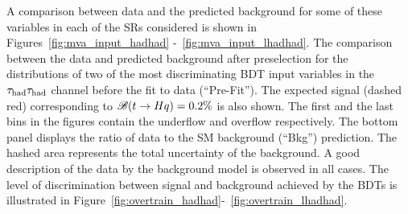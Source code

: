 A comparison between data and the predicted background for some of these variables in each of the SRs considered is shown in Figures~\ref{fig:mva_input_hadhad} -~\ref{fig:mva_input_lhadhad}. The comparison between the data and predicted background after preselection for the distributions of two of the most 
discriminating BDT input variables in the $\tau_{\mathrm{had}} \tau_{\mathrm{had}}$ channel before the fit to data (``Pre-Fit'').
The expected signal (dashed red) corresponding to $\mathscr{B}(t\to Hq)=0.2\%$ is also shown.
The first and the last bins in the figures contain the underflow and overflow respectively.
The bottom panel displays the ratio of data to the SM background (``Bkg'') prediction.
The hashed area represents the total uncertainty of the background.
A good description of the data by the background model is observed in all cases.
The level of discrimination between signal and background achieved by the BDTs is illustrated in Figure~\ref{fig:overtrain_hadhad}-~\ref{fig:overtrain_lhadhad}.



